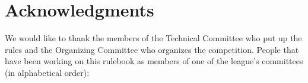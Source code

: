 
\section*{Acknowledgments}
\label{sec:acknowledgments}
We would like to thank the members of the Technical Committee who put up the rules and the Organizing Committee who organizes the competition.
People that have been working on this rulebook as members of one of the league's committees (in alphabetical order):
